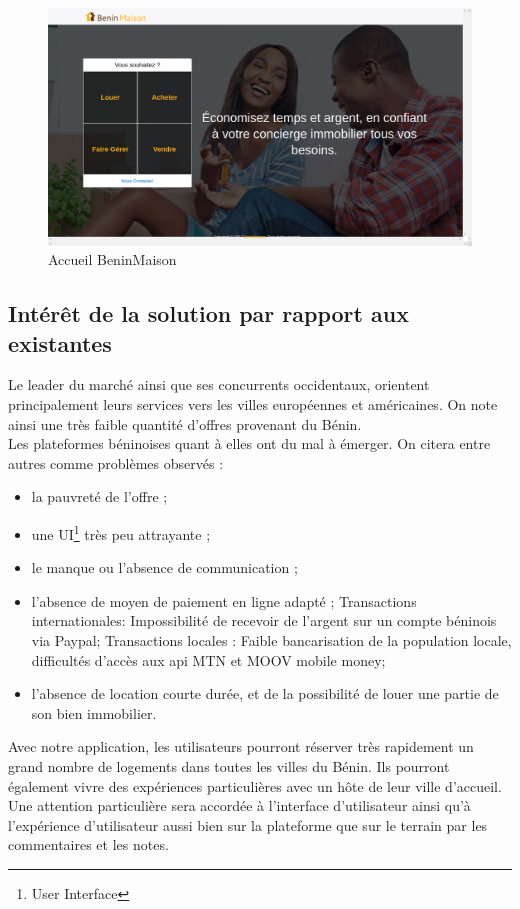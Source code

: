 $\phantom{11111111111111111} $ $\phantom{11111111111111111}$
\begin{figure}[H]
\begin{center}
\includegraphics[width=17cm]{images/concurrent/beninmaison1.png}
\end{center}
\caption{Accueil BeninMaison}
\end{figure}

\newpage
\subsection{Intérêt de la solution par rapport aux existantes} 
Le leader du marché ainsi que ses concurrents occidentaux, orientent principalement leurs services vers les villes européennes et américaines. On note ainsi une très faible quantité d’offres provenant du Bénin.
\\Les plateformes béninoises quant à elles ont du mal à émerger. On citera entre autres comme problèmes observés :
\begin{itemize}
\item[\textbullet] la pauvreté de l’offre ;
\item[\textbullet] une UI\footnote{User Interface} très peu attrayante ;
\item[\textbullet] le manque ou l’absence de communication ;
\item[\textbullet] l’absence de moyen de paiement en ligne adapté ;
\subitem[\textbullet] Transactions internationales: Impossibilité de recevoir de l’argent sur un compte béninois via Paypal;
\subitem[\textbullet] Transactions locales : Faible bancarisation de la population locale, difficultés d’accès aux api MTN et MOOV mobile money;
\item[\textbullet] l’absence de location courte durée, et de la possibilité de louer une partie de son bien immobilier.
\end{itemize}

Avec notre application, les utilisateurs pourront réserver très rapidement un grand nombre de logements dans toutes les villes du Bénin. Ils pourront également vivre des expériences particulières avec un hôte de leur ville d'accueil. Une attention particulière sera accordée à l’interface d’utilisateur ainsi qu'à l'expérience d’utilisateur aussi bien sur la plateforme que sur le terrain par les commentaires et les notes.